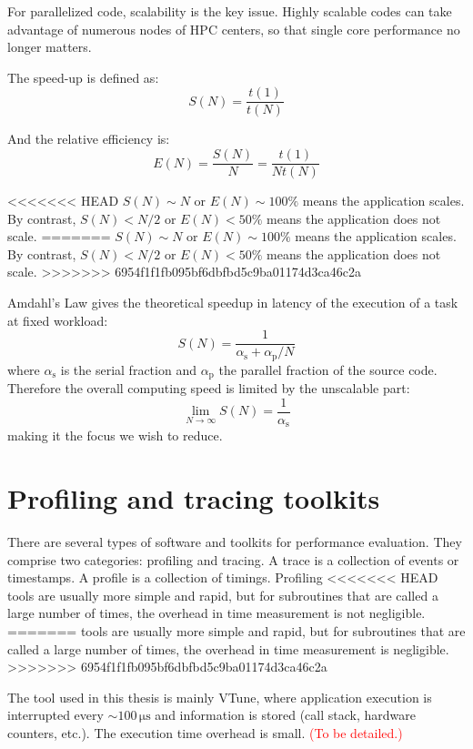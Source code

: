 For parallelized code, scalability is the key issue. Highly scalable
codes can take advantage of numerous nodes of HPC centers, so that
single core performance no longer matters. 

The speed-up is defined as:
\begin{equation}
S(N)=\dfrac{t(1)}{t(N)}
\end{equation}


And the relative efficiency is:
\begin{equation}
E(N)=\dfrac{S(N)}{N}=\dfrac{t(1)}{Nt(N)}
\end{equation}


<<<<<<< HEAD
$S(N)\sim N$ or $E(N)\sim100\%$ means the application scales. 
By contrast, $S(N)<N/2$ or $E(N)<50\%$ means the application does not
scale. 
=======
$S(N)\sim N$ or $E(N)\sim100\%$ means the application scales. 
By contrast, $S(N)<N/2$ or $E(N)<50\%$ means the application does
not scale. 
>>>>>>> 6954f1f1fb095bf6dbfbd5c9ba01174d3ca46c2a

Amdahl's Law gives the theoretical speedup in latency of the execution
of a task at fixed workload:
\begin{equation}
S(N)=\dfrac{1}{\alpha_{\mathrm{s}}+\alpha_{\mathrm{p}}/N}
\end{equation}
where $\alpha_{\mathrm{s}}$ is the serial fraction and $\alpha_{\mathrm{p}}$
the parallel fraction of the source code. Therefore the overall computing
speed is limited by the unscalable part:
\begin{equation}
\lim_{N\rightarrow\infty}S(N)=\frac{1}{\alpha_{\mathrm{s}}}
\end{equation}
making it the focus we wish to reduce.


\section{Profiling and tracing toolkits}

There are several types of software and toolkits for performance evaluation.
They comprise two categories: profiling and tracing. A trace is a collection
of events or timestamps. A profile is a collection of timings. Profiling
<<<<<<< HEAD
tools are usually more simple and rapid, but for subroutines that
are called a large number of times, the overhead in time measurement
is not negligible. 
=======
tools are usually more simple and rapid, but for subroutines that are called
a large number of times, the overhead in time measurement is negligible. 
>>>>>>> 6954f1f1fb095bf6dbfbd5c9ba01174d3ca46c2a

The tool used in this thesis is mainly VTune, where application execution
is interrupted every $\sim100\,\mathrm{\mu s}$ and information is
stored (call stack, hardware counters, etc.). The execution time overhead
is small. \textcolor{red}{(To be detailed.)}
